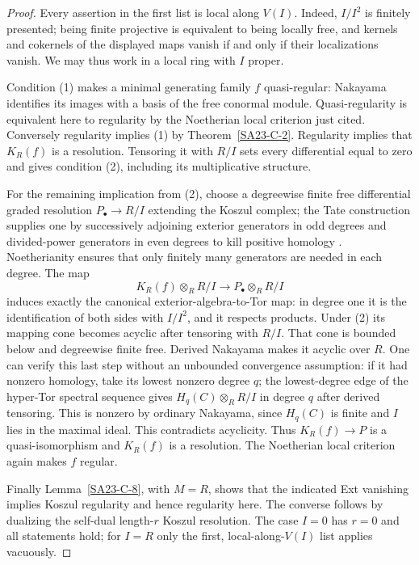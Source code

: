 \begin{proof}
Every assertion in the first list is local along $V(I)$.  Indeed,
$I/I^2$ is finitely presented; being finite projective is equivalent
to being locally free, and kernels and cokernels of the displayed
maps vanish if and only if their localizations vanish.  We may thus
work in a local ring with $I$ proper.

Condition (1) makes a minimal generating family $f$ quasi-regular:
Nakayama identifies its images with a basis of the free conormal
module.  Quasi-regularity is equivalent here to regularity by the
Noetherian local criterion just cited.  Conversely regularity implies
(1) by Theorem~\ref{SA23-C-2}.  Regularity implies that $K_R(f)$ is a
resolution.  Tensoring it with $R/I$ sets every differential equal to
zero and gives condition (2), including its multiplicative structure.

For the remaining implication from (2), choose a degreewise finite
free differential graded resolution $P_\bullet\to R/I$ extending
the Koszul complex; the Tate construction supplies one by
successively adjoining exterior generators in odd degrees and
divided-power generators in even degrees to kill positive homology
\cite[Lemma 23.6.9, construction with $A(0)=R$ and $A(1)=K_R(f)$]{algStacksTate}.
Noetherianity ensures that only finitely many generators are needed
in each degree.  The map
\[
 K_R(f)\otimes_R R/I\longrightarrow P_\bullet\otimes_R R/I
\]
induces exactly the canonical exterior-algebra-to-Tor map: in degree
one it is the identification of both sides with $I/I^2$, and it
respects products.  Under (2) its mapping cone becomes acyclic after
tensoring with $R/I$.  That cone is bounded below and degreewise
finite free.  Derived Nakayama makes it acyclic over $R$.  One can
verify this last step without an unbounded convergence assumption:
if it had nonzero homology, take its lowest nonzero degree $q$;
the lowest-degree edge of the hyper-Tor spectral sequence gives
$H_q(C)\otimes_R R/I$ in degree $q$ after derived tensoring.
This is nonzero by ordinary Nakayama, since $H_q(C)$ is finite and
$I$ lies in the maximal ideal.  This contradicts acyclicity.
Thus $K_R(f)\to P$ is a quasi-isomorphism and $K_R(f)$ is a resolution.
The Noetherian local criterion again makes $f$ regular.

Finally Lemma~\ref{SA23-C-8}, with $M=R$, shows that the indicated
Ext vanishing implies Koszul regularity and hence regularity here.
The converse follows by dualizing the self-dual length-$r$ Koszul
resolution.  The case $I=0$ has $r=0$ and all statements hold; for
$I=R$ only the first, local-along-$V(I)$ list applies vacuously.
\end{proof}

